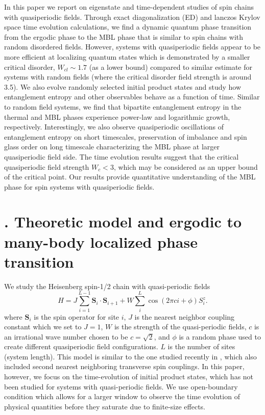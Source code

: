 \documentclass[prl,aps,epsf,showpacs,twocolumn,letterpaper]{revtex4}
\let\oldsection\section
\renewcommand{\section}[1]{\stepcounter{section}\oldsection{\Roman{section}. #1}}
\begin{document}
In this paper we report on eigenstate and time-dependent studies of spin chains with quasiperiodic fields.  Through exact diagonalization (ED) and lanczos  Krylov space time evolution calculations, we find a dynamic quantum phase transition from the ergodic phase to the MBL phase that is similar to spin chains with random disordered fields.  However, systems with quasiperiodic fields  appear to be more efficient at localizing quantum states which is demonstrated by a smaller critical disorder, $W_{cl} \sim 1.7$ (as a lower bound) compared to similar estimate for systems with random  fields\cite{luitz2015} (where the critical disorder field strength
is around 3.5).  We also evolve randomly selected initial product states  and study how entanglement entropy and other observables behave as a function of time.  Similar to random field systems, we find that bipartite entanglement entropy in the thermal  and MBL phases experience power-law and logarithmic growth, respectively.  Interestingly, we also observe quasiperiodic oscillations of entanglement entropy on short timescales,  preservation of imbalance and spin glass order on  long timescale  characterizing  the MBL phase at larger quasiperiodic field side.  
The time evolution results suggest that the critical quasiperiodic field strength $W_c<3$,  which may be considered as an upper bound of the critical point.
Our results provide quantitative understanding of the MBL phase
for spin systems with quasiperiodic fields.   %


\section{Theoretic model and  ergodic to many-body localized phase transition}


We study the Heisenberg spin-1/2 chain with  quasi-periodic fields
\begin{equation}
H = J\sum_{i=1}^{L-1} \mathbf{S}_i \cdot \mathbf{S}_{i+1} + W\sum_{i}^{L} \cos(2\pi c i+\phi) S_i^z \text{.}
\end{equation}
where $\mathbf{S}_i$ is the spin operator for site $i$, $J$ is the nearest neighbor coupling constant which we set to $J=1$, $W$ is the strength of the quasi-periodic fields, $c$ is an irrational wave number chosen to be $c=\sqrt{2}$, and $\phi$ is a random phase used to create different quasiperiodic field  configurations. $L$ is the number of sites (system length).  This model is similar to the one studied recently in \cite{vedika2017}, which also included second nearest neighboring transverse spin couplings.  In this paper, however, we focus on   the time-evolution of initial product states,  which has not been studied for systems with quasi-periodic fields.  We use open-boundary condition which allows for a larger window to observe the time evolution of physical quantities\cite{luitz2016time} before they saturate due to finite-size effects.  
\end{document}
